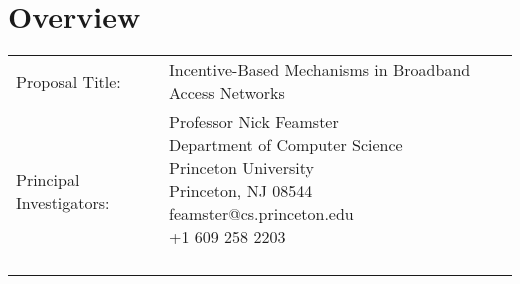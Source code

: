 \documentclass{shortpaper}
\begin{document}

\section*{Overview}

\begin{tabular}{p{2in}p{4in}}
Proposal Title: & \parbox{4in}{Incentive-Based Mechanisms in Broadband
  Access Networks} \\ 
Principal Investigators: & 
\parbox{4in}{
Professor Nick Feamster \\
Department of Computer Science \\
Princeton University \\
Princeton, NJ 08544 \\
feamster@cs.princeton.edu \\
+1 609 258 2203 \\
\\
}
\end{tabular}
\fi


\pagebreak
\begin{small}

%
\end{small}
\end{document}
